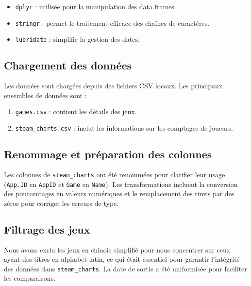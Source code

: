\documentclass[mstat,12pt]{unswthesis}
\begin{document}
\begin{itemize}
\tightlist
\item
  \texttt{dplyr} : utilisée pour la manipulation des data frames.
\item
  \texttt{stringr} : permet le traitement efficace des chaînes de
  caractères.
\item
  \texttt{lubridate} : simplifie la gestion des dates.
\end{itemize}

\hypertarget{chargement-des-donnuxe9es}{%
\subsection{Chargement des données}\label{chargement-des-donnuxe9es}}

Les données sont chargées depuis des fichiers CSV locaux. Les principaux
ensembles de données sont :

\begin{enumerate}
\item \texttt{games.csv} : contient les détails des jeux.
\item \texttt{steam\_charts.csv} : inclut les informations sur les comptages de joueurs.
\end{enumerate}

\hypertarget{renommage-et-pruxe9paration-des-colonnes}{%
\subsection{Renommage et préparation des
colonnes}\label{renommage-et-pruxe9paration-des-colonnes}}

Les colonnes de \texttt{steam\_charts} ont été renommées pour clarifier
leur usage (\texttt{App.ID} en \texttt{AppID} et \texttt{Game} en
\texttt{Name}). Les transformations incluent la conversion des
pourcentages en valeurs numériques et le remplacement des tirets par des
zéros pour corriger les erreurs de type.

\hypertarget{filtrage-des-jeux}{%
\subsection{Filtrage des jeux}\label{filtrage-des-jeux}}

Nous avons exclu les jeux en chinois simplifié pour nous concentrer sur
ceux ayant des titres en alphabet latin, ce qui était essentiel pour
garantir l'intégrité des données dans \texttt{steam\_charts}. La date de
sortie a été uniformisée pour faciliter les comparaisons.
\end{document}

